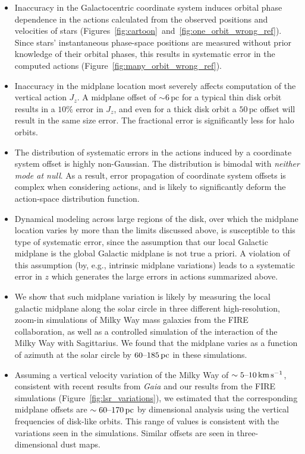 \documentclass[twocolumn]{aastex62}
\newcommand{\pc}{\text{pc}}
\newcommand{\kms}{\text{km}\,\text{s}^{-1}}
\begin{document}
\begin{itemize}
\item Inaccuracy in the Galactocentric coordinate
system induces orbital phase 
dependence in the actions calculated from the observed
positions and velocities of stars
(Figures~\ref{fig:cartoon}~and~\ref{fig:one_orbit_wrong_ref}). Since stars'
instantaneous phase-space positions are measured without prior knowledge of
their orbital phases, this results in systematic error in the computed actions
(Figure~\ref{fig:many_orbit_wrong_ref}).

\item Inaccuracy in the midplane location most severely affects computation of
the vertical action $J_z$. A midplane offset of $\sim6\,\pc$ 
for a typical thin
disk orbit results in a $10\%$ error in $J_z$, 
and even for a thick disk orbit a $50\,\pc$ offset will result
in the same size error.
The fractional error is
significantly less for halo orbits.

\item The distribution of systematic errors in the actions induced by a
coordinate system offset is highly
non-Gaussian. The distribution is bimodal
with \emph{neither mode at null}. As a result, error propagation of coordinate
system offsets is complex when considering actions, and is likely to
significantly deform the action-space distribution function.

\item Dynamical modeling across large regions of the disk, over which the
midplane location varies by more than the limits discussed above, is
susceptible to this type of systematic error, since the assumption that our
local Galactic midplane is the global Galactic midplane is not true a
priori. A violation of this assumption (by, e.g., intrinsic midplane
variations) leads to a systematic error in $z$ which generates the 
large errors in actions summarized above.

\item 
We show that such midplane variation is likely by measuring
the local galactic
midplane along the solar circle in three different high-resolution, zoom-in
simulations of Milky Way mass galaxies from the FIRE collaboration, as well as a controlled simulation of the interaction of the Milky Way with Sagittarius. We found
that the midplane varies as a function of azimuth at the solar circle by
$60\textup{--}185\,\pc$ in these simulations.

\item Assuming a vertical velocity variation of the Milky Way of
$\sim5\textup{--}10\,\kms$, consistent with recent results from
\textit{Gaia} 
and our results from the FIRE
simulations (Figure~\ref{fig:lsr_variations}), we estimated that the
corresponding midplane offsets are $\sim60\textup{--}170\,\pc$ by dimensional
analysis 
using 
the vertical frequencies of disk-like orbits. 
This range of values is consistent with the variations seen in the simulations.
Similar offsets are seen in three-dimensional dust maps.


\end{itemize}
\end{document}
